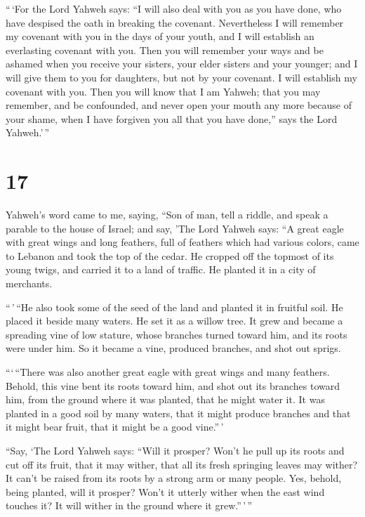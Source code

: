  ``\,`For the Lord Yahweh says: ``I will also deal with
you as you have done, who have despised the oath in breaking the
covenant.  Nevertheless I will remember my covenant with
you in the days of your youth, and I will establish an everlasting
covenant with you.  Then you will remember your ways and
be ashamed when you receive your sisters, your elder sisters and your
younger; and I will give them to you for daughters, but not by your
covenant.  I will establish my covenant with you. Then
you will know that I am Yahweh;  that you may remember,
and be confounded, and never open your mouth any more because of your
shame, when I have forgiven you all that you have done,'' says the Lord
Yahweh.'\,''

\hypertarget{section-15}{%
\section{17}\label{section-15}}

 Yahweh's word came to me, saying,  ``Son of
man, tell a riddle, and speak a parable to the house of Israel;
 and say, 'The Lord Yahweh says: ``A great eagle with
great wings and long feathers, full of feathers which had various
colors, came to Lebanon and took the top of the cedar.  He
cropped off the topmost of its young twigs, and carried it to a land of
traffic. He planted it in a city of merchants.

 ``\,'\,``He also took some of the seed of the land and
planted it in fruitful soil. He placed it beside many waters. He set it
as a willow tree.  It grew and became a spreading vine of
low stature, whose branches turned toward him, and its roots were under
him. So it became a vine, produced branches, and shot out sprigs.

 ```\,``There was also another great eagle with great
wings and many feathers. Behold, this vine bent its roots toward him,
and shot out its branches toward him, from the ground where it was
planted, that he might water it.  It was planted in a good
soil by many waters, that it might produce branches and that it might
bear fruit, that it might be a good vine.''\,'

 ``Say, `The Lord Yahweh says: ``Will it prosper? Won't he
pull up its roots and cut off its fruit, that it may wither, that all
its fresh springing leaves may wither? It can't be raised from its roots
by a strong arm or many people.  Yes, behold, being
planted, will it prosper? Won't it utterly wither when the east wind
touches it? It will wither in the ground where it grew.''\,'\,''

